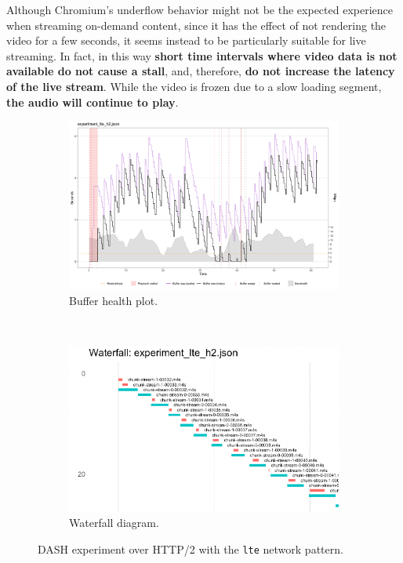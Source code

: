 Although Chromium's underflow behavior might not be the expected experience when streaming on-demand content, since it has the effect of not rendering the video for a few seconds, it seems instead to be particularly suitable for live streaming. In fact, in this way \textbf{short time intervals where video data is not available do not cause a stall}, and, therefore, \textbf{do not increase the latency of the live stream}. While the video is frozen due to a slow loading segment, \textbf{the audio will continue to play}.

\begin{figure}[h]
	\centering
	
	\begin{subfigure}[t]{0.45\textwidth}
		\centering
		\includegraphics[width=\textwidth]{res/eval_nonabr_lte_h2.png}
		\caption{Buffer health plot.}
		\label{fig:eval_nonabr_lte_h2_buffer}
	\end{subfigure}%
	~ 
	\begin{subfigure}[t]{0.45\textwidth}
		\centering
		\includegraphics[width=\textwidth]{res/eval_nonabr_lte_h2_waterfall.png}
		\caption{Waterfall diagram.}
		\label{fig:eval_nonabr_lte_h2_waterfall}
	\end{subfigure}
	
	\caption{DASH experiment over HTTP/2 with the \texttt{lte} network pattern.}
	\label{fig:eval_nonabr_lte_h2}
\end{figure}

